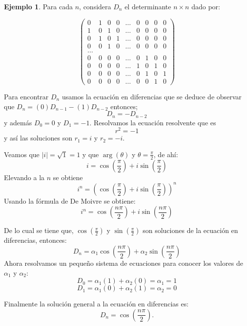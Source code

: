 \documentclass{report}
\theoremstyle{definition}
\newtheorem{ejemplo}[teorema]{Ejemplo}
\begin{document}
\begin{ejemplo}

Para cada $n$, considera $D_{n}$ el determinante $n\times n$ dado por:

\begin{equation*}
\begin{pmatrix}
0 & 1 & 0 & 0 &\ldots & 0 & 0 & 0 & 0\\
1 & 0 & 1 & 0 &\ldots & 0 & 0 & 0 & 0\\
0 & 1 & 0 & 1 &\ldots & 0 & 0 & 0 & 0\\
0 & 0 & 1 & 0 &\ldots & 0 & 0 & 0 & 0\\
\ldots\\
0 & 0 & 0 & 0 &\ldots & 0 & 1 & 0 & 0\\
0 & 0 & 0 & 0 &\ldots & 1 & 0 & 1 & 0\\
0 & 0 & 0 & 0 &\ldots & 0 & 1 & 0 & 1\\
0 & 0 & 0 & 0 &\ldots & 0 & 0 & 1 & 0
\end{pmatrix}
\end{equation*}


Para encontrar $D_{n}$ usamos la ecuación en diferencias que se deduce de observar
que $D_{n}=(0)D_{n-1}-(1)D_{n-2}$ entonces;
\begin{equation}
  \label{determinante}
D_{n}=-D_{n-2}
\end{equation}
 y además $D_{0}=0$ y $D_{1}=-1$.
Resolvamos la ecuación resolvente que es $$r^{2}=-1$$ y así las soluciones son $r_{1}=i$ y  $r_{2}=-i$.

Veamos que  $|i|=\sqrt{1}=1$ y que $\arg(\theta)$ y $\theta= \frac{\pi}{2}$, de ahí:
$$i=\cos(\frac{\pi}{2})+i\sin(\frac{\pi}{2})$$
Elevando a la $n$ se obtiene
$$i^n=(\cos(\frac{\pi}{2})+i\sin(\frac{\pi}{2}))^{n}$$
Usando la fórmula de De Moivre se obtiene:
$$i^n=\cos(\frac{n\pi}{2})+i\sin(\frac{n\pi}{2})$$

De lo cual se tiene que, $\cos(\frac{\pi}{2})$ y  $\sin(\frac{\pi}{2})$ son soluciones de la ecuación en diferencias, entonces: 
$$D_{n}=\alpha_{1}\cos(\frac{n\pi}{2})+\alpha_{2}\sin(\frac{n\pi}{2})$$
Ahora resolvamos un pequeño sistema de ecuaciones para conocer los valores de $\alpha_1$ y $\alpha_2$:
  $$D_{0}=\alpha_{1}(1)+\alpha_{2}(0)=\alpha_{1}=1$$
  $$D_{1}=\alpha_{1}(0)+\alpha_{2}(1)=\alpha_{2}=0$$

Finalmente la solución general a la ecuación en diferencias es:
\begin{equation}
  \label{solucion determinante}
D_{n}=\cos(\frac{n\pi}{2}).
\end{equation}

\end{ejemplo}
\end{document}
